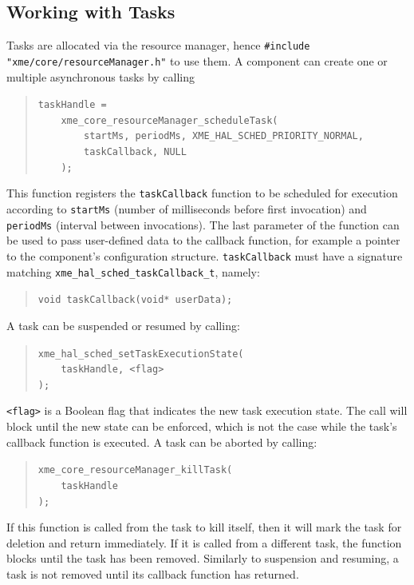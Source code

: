 \subsection{Working with Tasks}

Tasks are allocated via the resource manager,
hence \verb|#include| \verb|"xme/core/resourceManager.h"| to use them.
A component can create one or multiple asynchronous tasks by calling

\begin{quote}
	\verb|taskHandle = |\\
	\verb|    xme_core_resourceManager_scheduleTask(|\\
	\verb|        startMs, periodMs, XME_HAL_SCHED_PRIORITY_NORMAL,|\\
	\verb|        taskCallback, NULL|\\
	\verb|    );|
\end{quote}

This function registers the \verb|taskCallback| function to be scheduled for execution
according to \verb|startMs| (number of milliseconds before first invocation) and
\verb|periodMs| (interval between invocations).
%
The last parameter of the function can be used to pass user-defined data to the callback function,
for example a pointer to the component's configuration structure.
%
\verb|taskCallback| must have a signature matching \verb|xme_hal_sched_taskCallback_t|, namely:
\begin{quote}
	\verb|void taskCallback(void* userData);|
\end{quote}

A task can be suspended or resumed by calling:

\begin{quote}
	\verb|xme_hal_sched_setTaskExecutionState(|\\
	\verb|    taskHandle, <flag>|\\
	\verb|);|
\end{quote}

\verb|<flag>| is a Boolean flag that indicates the new task execution state.
The call will block until the new state can be enforced,
which is not the case while the task's callback function is executed.
%
A task can be aborted by calling:

\begin{quote}
	\verb|xme_core_resourceManager_killTask(|\\
	\verb|    taskHandle|\\
	\verb|);|
\end{quote}

If this function is called from the task to kill itself, then it will mark the task for deletion and return immediately.
If it is called from a different task, the function blocks until the task has been removed.
Similarly to suspension and resuming, a task is not removed until its callback function has returned.

